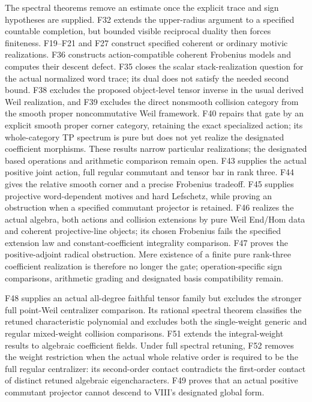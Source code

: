 \documentclass[11pt,a4paper]{article}
\theoremstyle{named}\newtheorem{finding}{Finding}[section]
\theoremstyle{definition}\newtheorem{definition}[finding]{Definition}
\theoremstyle{remark}\newtheorem{remark}[finding]{Remark}
\begin{document}
The spectral theorems remove an estimate once the explicit trace and sign hypotheses are supplied. F32 extends the upper-radius argument to a specified countable completion, but bounded visible reciprocal duality then forces finiteness. F19--F21 and F27 construct specified coherent or ordinary motivic realizations. F36 constructs action-compatible coherent Frobenius models and computes their descent defect. F35 closes the scalar stack-realization question for the actual normalized word trace; its dual does not satisfy the needed second bound. F38 excludes the proposed object-level tensor inverse in the usual derived Weil realization, and F39 excludes the direct nonsmooth collision category from the smooth proper noncommutative Weil framework. F40 repairs that gate by an explicit smooth proper corner category, retaining the exact specialized action; its whole-category TP spectrum is pure but does not yet realize the designated coefficient morphisms. These results narrow particular realizations; the designated based operations and arithmetic comparison remain open.  F43 supplies the actual positive joint action, full regular
commutant and tensor bar in rank three. F44 gives the relative
smooth corner and a precise Frobenius tradeoff. F45 supplies
projective word-dependent motives and hard Lefschetz, while proving
an obstruction when a specified commutant projector is retained.
F46 realizes the actual algebra, both actions and collision
extensions by pure Weil End/Hom data and coherent projective-line
objects; its chosen Frobenius fails the specified extension law
and constant-coefficient integrality comparison. F47 proves the
positive-adjoint radical obstruction. Mere existence of a finite
pure rank-three coefficient realization is therefore no longer
the gate; operation-specific sign comparisons, arithmetic grading and
designated basis compatibility remain.

F48 supplies an actual all-degree faithful tensor family but excludes the stronger full point-Weil centralizer comparison. Its rational spectral theorem classifies the retuned characteristic polynomial and excludes both the single-weight generic and regular mixed-weight collision comparisons. F51 extends the integral-weight results to algebraic coefficient fields. Under full spectral retuning, F52 removes the weight restriction when the actual whole relative order is required to be the full regular centralizer: its second-order contact contradicts the first-order contact of distinct retuned algebraic eigencharacters. F49 proves that an actual positive commutant projector cannot descend to VIII's designated global form.
\end{document}
